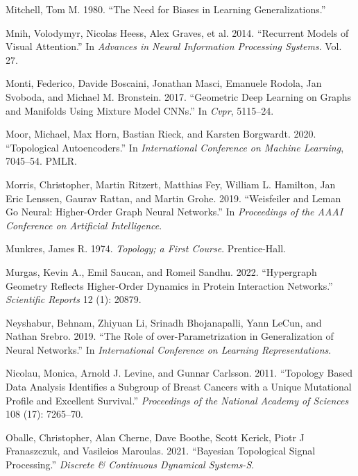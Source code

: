 \documentclass[
  12pt,
]{krantz}
\newlength{\cslhangindent}
\newenvironment{CSLReferences}[2] %
 {\begin{list}{}{%
  \setlength{\itemindent}{0pt}
  \setlength{\leftmargin}{0pt}
  \setlength{\parsep}{0pt}
  \ifodd #1
   \setlength{\leftmargin}{\cslhangindent}
   \setlength{\itemindent}{-1\cslhangindent}
  \fi
  \setlength{\itemsep}{#2\baselineskip}}}
 {\end{list}}
\begin{document}
\begin{CSLReferences}{1}{0}
Mitchell, Tom M. 1980. {``The Need for Biases in Learning
Generalizations.''}

Mnih, Volodymyr, Nicolas Heess, Alex Graves, et al. 2014. {``Recurrent
Models of Visual Attention.''} In \emph{Advances in Neural Information
Processing Systems}. Vol. 27.

Monti, Federico, Davide Boscaini, Jonathan Masci, Emanuele Rodola, Jan
Svoboda, and Michael M. Bronstein. 2017. {``Geometric Deep Learning on
Graphs and Manifolds Using Mixture Model {CNNs}.''} In \emph{Cvpr},
5115--24.

Moor, Michael, Max Horn, Bastian Rieck, and Karsten Borgwardt. 2020.
{``Topological Autoencoders.''} In \emph{International Conference on
Machine Learning}, 7045--54. PMLR.

Morris, Christopher, Martin Ritzert, Matthias Fey, William L. Hamilton,
Jan Eric Lenssen, Gaurav Rattan, and Martin Grohe. 2019. {``Weisfeiler
and {L}eman Go Neural: Higher-Order Graph Neural Networks.''} In
\emph{Proceedings of the AAAI Conference on Artificial Intelligence}.

Munkres, James R. 1974. \emph{Topology; a First Course}. Prentice-Hall.

Murgas, Kevin A., Emil Saucan, and Romeil Sandhu. 2022. {``Hypergraph
Geometry Reflects Higher-Order Dynamics in Protein Interaction
Networks.''} \emph{Scientific Reports} 12 (1): 20879.

Neyshabur, Behnam, Zhiyuan Li, Srinadh Bhojanapalli, Yann LeCun, and
Nathan Srebro. 2019. {``The Role of over-Parametrization in
Generalization of Neural Networks.''} In \emph{International Conference
on Learning Representations}.

Nicolau, Monica, Arnold J. Levine, and Gunnar Carlsson. 2011.
{``Topology Based Data Analysis Identifies a Subgroup of Breast Cancers
with a Unique Mutational Profile and Excellent Survival.''}
\emph{Proceedings of the National Academy of Sciences} 108 (17):
7265--70.

Oballe, Christopher, Alan Cherne, Dave Boothe, Scott Kerick, Piotr J
Franaszczuk, and Vasileios Maroulas. 2021. {``Bayesian Topological
Signal Processing.''} \emph{Discrete \& Continuous Dynamical Systems-S}.


\end{CSLReferences}
\end{document}
